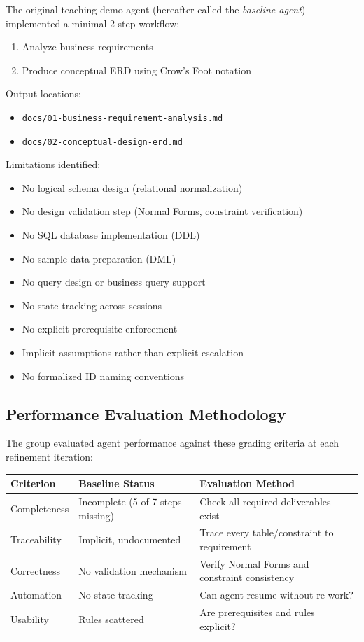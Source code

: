 \documentclass[12pt,a4paper]{article}
\begin{document}
The original teaching demo agent (hereafter called the \textit{baseline agent}) implemented a minimal 2-step workflow:

\begin{enumerate}
    \item Analyze business requirements
    \item Produce conceptual ERD using Crow's Foot notation
\end{enumerate}

\noindent Output locations:
\begin{itemize}
    \item \texttt{docs/01-business-requirement-analysis.md}
    \item \texttt{docs/02-conceptual-design-erd.md}
\end{itemize}

\noindent Limitations identified:
\begin{itemize}
    \item No logical schema design (relational normalization)
    \item No design validation step (Normal Forms, constraint verification)
    \item No SQL database implementation (DDL)
    \item No sample data preparation (DML)
    \item No query design or business query support
    \item No state tracking across sessions
    \item No explicit prerequisite enforcement
    \item Implicit assumptions rather than explicit escalation
    \item No formalized ID naming conventions
\end{itemize}

\subsection{Performance Evaluation Methodology}

The group evaluated agent performance against these grading criteria at each refinement iteration:

\begin{table}[h]
\centering
\begin{tabular}{|p{3cm}|p{4cm}|p{4cm}|}
\hline
\textbf{Criterion} & \textbf{Baseline Status} & \textbf{Evaluation Method} \\
\hline
Completeness & Incomplete (5 of 7 steps missing) & Check all required deliverables exist \\
\hline
Traceability & Implicit, undocumented & Trace every table/constraint to requirement \\
\hline
Correctness & No validation mechanism & Verify Normal Forms and constraint consistency \\
\hline
Automation & No state tracking & Can agent resume without re-work? \\
\hline
Usability & Rules scattered & Are prerequisites and rules explicit? \\
\hline
\end{tabular}
\end{table}
\end{document}
